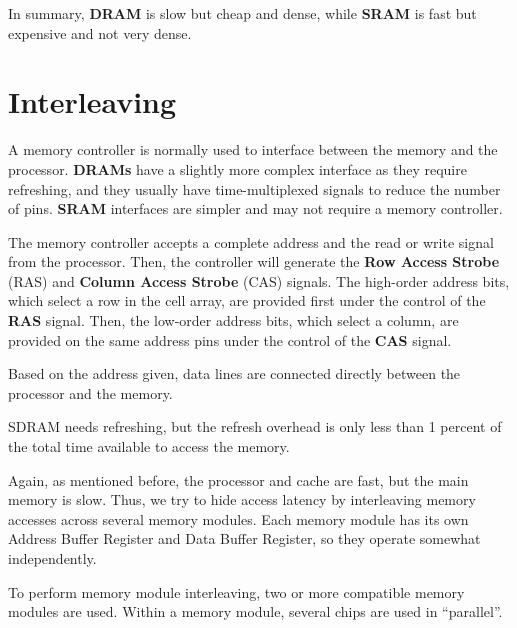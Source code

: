In summary, \textbf{DRAM} is slow but cheap and dense, while \textbf{SRAM} is fast but expensive and not very dense.

\section{Interleaving}
A memory controller is normally used to interface between the memory and the processor. \textbf{DRAMs} have a slightly more complex interface as they require refreshing, and they usually have time-multiplexed signals to reduce the number of pins. \textbf{SRAM} interfaces are simpler and may not require a memory controller.

The memory controller accepts a complete address and the read or write signal from the processor. Then, the controller will generate the \textbf{Row Access Strobe} (RAS) and \textbf{Column Access Strobe} (CAS) signals. The high-order address bits, which select a row in the cell array, are provided first under the control of the \textbf{RAS} signal. Then, the low-order address bits, which select a column, are provided on the same address pins under the control of the \textbf{CAS} signal.

Based on the address given, data lines are connected directly between the processor and the memory.

SDRAM needs refreshing, but the refresh overhead is only less than 1 percent of the total time available to access the memory.

Again, as mentioned before, the processor and cache are fast, but the main memory is slow. Thus, we try to hide access latency by interleaving memory accesses across several memory modules. Each memory module has its own Address Buffer Register and Data Buffer Register, so they operate somewhat independently.

To perform memory module interleaving, two or more compatible memory modules are used. Within a memory module, several chips are used in ``parallel''.

